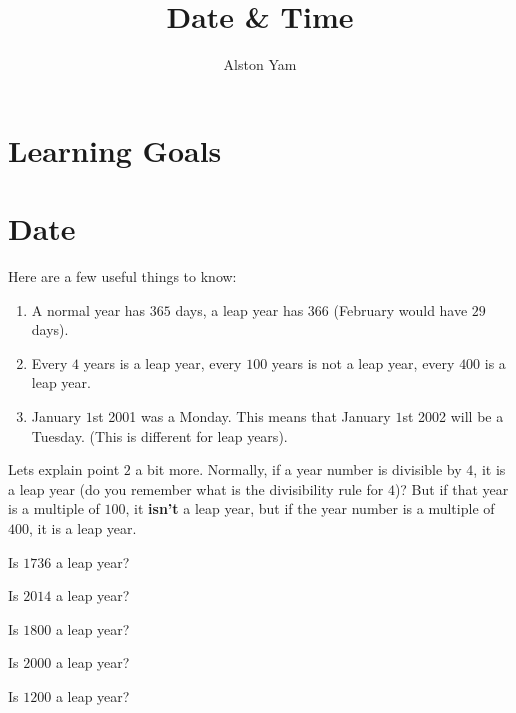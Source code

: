 \documentclass{article}
\title{Date \& Time}
\author{Alston Yam}
\date{}
\theoremstyle{mytheoremstyle}
\theoremstyle{mytheoremstyle}
\theoremstyle{myproblemstyle}
\begin{document}
    \maketitle
    
    \section*{Learning Goals}

    \section{Date}

    Here are a few useful things to know:

    \begin{enumerate}
        \item A normal year has $365$ days, a leap year has $366$ (February would have $29$ days).
        \item Every $4$ years is a leap year, every $100$ years is not a leap year, every $400$ is a leap year.
        \item January $1$st 2001 was a Monday. This means that January $1$st 2002 will be a Tuesday. (This is different for leap years).
    \end{enumerate}

    Lets explain point $2$ a bit more. Normally, if a year number is divisible by $4$, it is a leap year (do you remember what is the divisibility rule for $4$)? But if that year is a multiple of $100$, it \textbf{isn't} a leap year, but if the year number is a multiple of $400$, it is a leap year.

    \begin{problem}
        Is $1736$ a leap year?        
    \end{problem}

    \begin{problem}
        Is $2014$ a leap year?        
    \end{problem}

    \begin{problem}
        Is $1800$ a leap year?        
    \end{problem}

    \begin{problem}
        Is $2000$ a leap year?        
    \end{problem}

    \begin{problem}
        Is $1200$ a leap year?        
    \end{problem}
    
\end{document}

